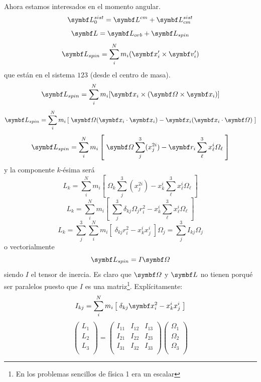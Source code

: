 \documentclass[10pt,oneside]{CBFT_book}
\begin{document}
Ahora estamos interesados en el momento angular.
\[
	\vb{L}_0^{sist} = \vb{L}^{cm} + \vb{L}_{cm}^{sist} 
\]
\[
	\vb{L} = \vb{L}_{orb} + \vb{L}_{spin} 
\]
\[
	\vb{L}_{spin} = \sum_i^N m_i ( \vb{x}_i' \times \vb{v}_i' )
\]
que están en el sistema $123$ (desde el centro de masa).
\[
	\vb{L}_{spin} = \sum_i^N m_i [ \vb{x}_i \times ( \vb{\Omega} \times \vb{x}_i ) ]
\]
\[
	\vb{L}_{spin} = \sum_i^N m_i \left[ \; 
	\vb{\Omega} (\vb{x}_i \cdot \vb{x}_i) - \vb{x}_i ( \vb{x}_i \cdot \vb{\Omega}) \; \right] 
\]
\[
	\vb{L}_{spin} = \sum_i^N m_i \left[ \; 
	\vb{\Omega} \sum_j^3 (x_j^{2i}) - \vb{r}_i \sum_\ell^3 x_\ell^i \Omega_\ell  \; \right] 
\]
y la componente $k$-ésima será 
\[
	L_k = \sum_i^N m_i \left[ \; 
	\Omega_k \sum_j^3 (x_j^{2i}) - x_k^i \sum_\ell^3 x_\ell^i \Omega_\ell  \; \right] 
\]
\[
	L_k = \sum_i^N m_i \left[ \; 
	\sum_j^3 \delta_{kj} \Omega_j r_i^{2} - x_k^i \sum_\ell^3 x_\ell^i \Omega_\ell  \; \right] 
\]
\[
	L_k = \sum_j^3 \sum_i^N m_i \left[ \; 
	\delta_{kj} r_i^{2} - x_k^i x_j^i  \; \right] \Omega_j = \sum_j^3 I_{kj} \Omega_j 
\]
o vectorialmente
\[
	\vb{L}_{spin} = I \vb{\Omega}
\]
siendo $I$ el tensor de inercia. Es claro que $\vb{\Omega}$ y $\vb{L}$ no tienen porqué ser paralelos puesto que $I$ es
una matriz\footnote{En los problemas sencillos de física 1 era un escalar}. 
Explícitamente:
\[
	I_{kj} = \sum_i^N m_i \left[ \; \delta_{kj} \vb{x}_i^{2} - x_k^i x_j^i  \; \right]
\]
\[
	\begin{pmatrix}
		L_1 \\
		L_2 \\ 
		L_3  \\
	\end{pmatrix} 
	=
	\begin{pmatrix}
		I_{11} & I_{12} & I_{13} \\
		I_{21} & I_{22} & I_{23} \\ 
		I_{31} & I_{32} & I_{33}  \\
	\end{pmatrix}
	\begin{pmatrix}
		\Omega_1 \\
		\Omega_2 \\ 
		\Omega_3  \\
	\end{pmatrix} 
\]
\end{document}
